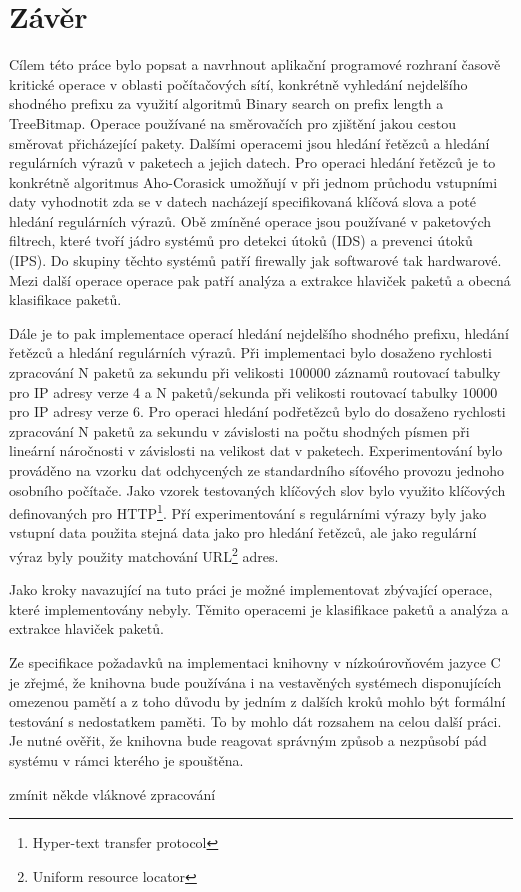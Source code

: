 \chapter{Závěr}\label{chapter:conclusion} %
Cílem této práce bylo popsat a navrhnout aplikační programové rozhraní časově kritické operace v oblasti počítačových sítí,
konkrétně vyhledání nejdelšího shodného prefixu za využití algoritmů Binary search on prefix length
a TreeBitmap. Operace používané na směrovačích pro zjištění jakou cestou směrovat přicházející pakety.
Dalšími operacemi jsou hledání řetězců a hledání regulárních výrazů v paketech a jejich datech.
Pro operaci hledání řetězců je to konkrétně algoritmus Aho-Corasick \cite{aho} umožňují v
při jednom průchodu vstupními daty vyhodnotit zda se v datech nacházejí specifikovaná klíčová slova
a poté hledání regulárních výrazů. Obě zmíněné operace jsou používané v paketových filtrech,
které tvoří jádro systémů pro detekci útoků (IDS) a prevenci útoků (IPS). Do skupiny těchto
systémů patří firewally jak softwarové tak hardwarové. Mezi další operace operace pak patří
analýza a extrakce hlaviček paketů a obecná klasifikace paketů.

Dále je to pak implementace operací hledání nejdelšího shodného prefixu, hledání řetězců
a hledání regulárních výrazů. Při implementaci bylo dosaženo rychlosti zpracování N paketů za sekundu
při velikosti $100000$ záznamů routovací tabulky pro IP adresy verze 4 a N paketů/sekunda při velikosti
routovací tabulky $10000$ pro IP adresy verze 6. Pro operaci hledání podřetězců bylo
do dosaženo rychlosti zpracování N paketů za sekundu v závislosti na počtu shodných písmen
při lineární náročnosti v závislosti na velikost dat v paketech. Experimentování bylo prováděno
na vzorku dat odchycených ze standardního síťového provozu jednoho osobního počítače. Jako vzorek
testovaných klíčových slov bylo využito klíčových definovaných pro HTTP\footnote{Hyper-text transfer protocol}.
Pří experimentování s regulárními výrazy byly jako vstupní data použita stejná data jako pro hledání řetězců,
ale jako regulární výraz byly použity matchování URL\footnote{Uniform resource locator} adres.

Jako kroky navazující na tuto práci je možné implementovat zbývající operace, které implementovány nebyly.
Těmito operacemi je klasifikace paketů a analýza a extrakce hlaviček paketů.

Ze specifikace požadavků na implementaci knihovny v nízkoúrovňovém jazyce C je zřejmé,
že knihovna bude používána i na vestavěných systémech disponujících omezenou pamětí a z toho
důvodu by jedním z dalších kroků mohlo být formální testování s nedostatkem paměti.
To by mohlo dát rozsahem na celou další práci. Je nutné ověřit, že knihovna bude
reagovat správným způsob a nezpůsobí pád systému v rámci kterého je spouštěna.

zmínit někde vláknové zpracování
